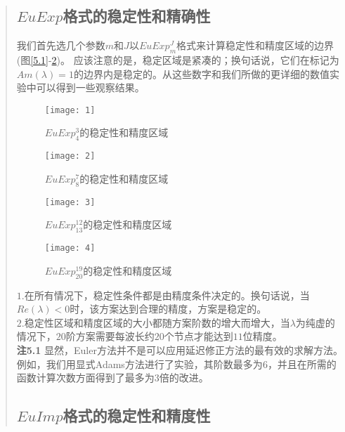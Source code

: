 \documentclass{article}
\begin{document}
\begin{CJK}{UTF8}{gkai}
\begin{quotation}
\subsection{$EuExp$格式的稳定性和精确性}

我们首先选几个参数$m$和$J$以$EuExp^{J}_{m}$格式来计算稳定性和精度区域的边界(图\ref{5.1}-\ref{5.4})。 应该注意的是，稳定区域是紧凑的；换句话说，它们在标记为$Am(\lambda)=1$的边界内是稳定的。从这些数字和我们所做的更详细的数值实验中可以得到一些观察结果。\\
\begin{figure}[h]
	{
		\begin{minipage}{6cm}
			\centering
			\texttt{[image: 1]}
			\caption{$EuExp_{4}^{3}$的稳定性和精度区域}
			\label{5.1}
		\end{minipage}
	}	
{
		\begin{minipage}{6cm}
			\centering
			\texttt{[image: 2]}
			\caption{$EuExp_{8}^{7}$的稳定性和精度区域}
			\label{5.2}
		\end{minipage}
}
\end{figure}
\begin{figure}[h]
{
		\begin{minipage}{6cm}
			\centering
			\texttt{[image: 3]}
			\caption{$EuExp_{13}^{12}$的稳定性和精度区域}
			\label{5.3}
		\end{minipage}
	}
{
		\begin{minipage}{6cm}
			\centering
			\texttt{[image: 4]}
			\caption{$EuExp_{20}^{19}$的稳定性和精度区域}
			\label{5.4}
		\end{minipage}
	}
\end{figure}

$1$.在所有情况下，稳定性条件都是由精度条件决定的。换句话说，当$Re(\lambda)<0$时，该方案达到合理的精度，方案是稳定的。\\

$2$.稳定性区域和精度区域的大小都随方案阶数的增大而增大，当$\lambda$为纯虚的情况下，$20$阶方案需要每波长约$20$个节点才能达到$11$位精度。\\

\textbf{注5.1} 显然，Euler方法并不是可以应用延迟修正方法的最有效的求解方法。例如，我们用显式Adams方法进行了实验，其阶数最多为$6$，并且在所需的函数计算次数方面得到了最多为$3$倍的改进。\\
\subsection{$EuImp$格式的稳定性和精度性}


\end{quotation}
\end{CJK}
\end{document}
